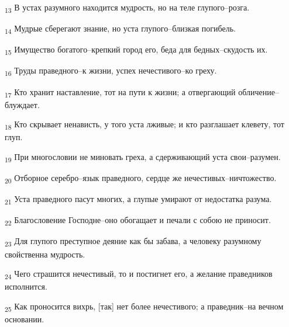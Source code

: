 \begin{tcolorbox}
\textsubscript{13} В устах разумного находится мудрость, но на теле глупого--розга.
\end{tcolorbox}
\begin{tcolorbox}
\textsubscript{14} Мудрые сберегают знание, но уста глупого--близкая погибель.
\end{tcolorbox}
\begin{tcolorbox}
\textsubscript{15} Имущество богатого--крепкий город его, беда для бедных--скудость их.
\end{tcolorbox}
\begin{tcolorbox}
\textsubscript{16} Труды праведного--к жизни, успех нечестивого--ко греху.
\end{tcolorbox}
\begin{tcolorbox}
\textsubscript{17} Кто хранит наставление, тот на пути к жизни; а отвергающий обличение--блуждает.
\end{tcolorbox}
\begin{tcolorbox}
\textsubscript{18} Кто скрывает ненависть, у того уста лживые; и кто разглашает клевету, тот глуп.
\end{tcolorbox}
\begin{tcolorbox}
\textsubscript{19} При многословии не миновать греха, а сдерживающий уста свои--разумен.
\end{tcolorbox}
\begin{tcolorbox}
\textsubscript{20} Отборное серебро--язык праведного, сердце же нечестивых--ничтожество.
\end{tcolorbox}
\begin{tcolorbox}
\textsubscript{21} Уста праведного пасут многих, а глупые умирают от недостатка разума.
\end{tcolorbox}
\begin{tcolorbox}
\textsubscript{22} Благословение Господне--оно обогащает и печали с собою не приносит.
\end{tcolorbox}
\begin{tcolorbox}
\textsubscript{23} Для глупого преступное деяние как бы забава, а человеку разумному свойственна мудрость.
\end{tcolorbox}
\begin{tcolorbox}
\textsubscript{24} Чего страшится нечестивый, то и постигнет его, а желание праведников исполнится.
\end{tcolorbox}
\begin{tcolorbox}
\textsubscript{25} Как проносится вихрь, [так] нет более нечестивого; а праведник--на вечном основании.
\end{tcolorbox}
